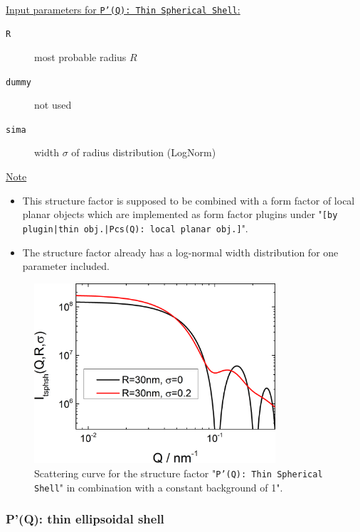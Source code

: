 \vspace{5mm}

\hspace{1pt}\\
\underline{Input parameters for \texttt{P'(Q): Thin Spherical Shell}:}
\begin{description}
    \item[\texttt{R}] most probable radius $R$
    \item[\texttt{dummy}] not used
    \item[\texttt{sima}] width $\sigma$ of radius distribution (LogNorm)
\end{description}

\noindent
\underline{Note}
\begin{itemize}
  \item This structure factor is supposed to be combined with a form factor of local planar objects which are implemented as form factor plugins
under "\texttt{[by plugin|thin obj.|Pcs(Q): local planar obj.]}".
\item The structure factor already has a log-normal width distribution for one parameter included.
\end{itemize}

\begin{figure}[htb]
\begin{center}
\includegraphics[width=0.8\textwidth,height=0.55\textwidth]{../images/form_factor/anisotropic/PprimeThinSphShell.png}
\end{center}
\caption{Scattering curve for the structure factor "\texttt{P'(Q): Thin Spherical Shell}" in combination with a constant background of 1".}
\label{fig_IQ:PprimeThinSphShell}
\end{figure}


\clearpage
\subsubsection{P'(Q): thin ellipsoidal shell} ~\\
\label{plugin:Pprime4ellShell}

